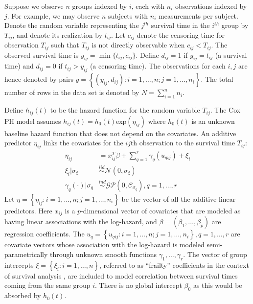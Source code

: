 \documentclass[ba]{imsart}
\begin{document}
Suppose we observe $n$ groups indexed by $i$, each with $n_{i}$ observations indexed by $j$. For example, we may observe $n$ subjects with $n_{i}$ measurements per subject. Denote the random variable representing the $j^{th}$ survival time in the $i^{th}$ group by $T_{ij}$, and denote its realization by $t_{ij}$. Let $c_{ij}$ denote the censoring time for observation $T_{ij}$ such that $T_{ij}$ is not directly observable when $c_{ij} < T_{ij}$. The observed survival time is $y_{ij} = \min\{t_{ij},c_{ij}\}$. Define $d_{ij} = 1$ if $y_{ij} = t_{ij}$ (a survival time) and $d_{ij} = 0$ if $t_{ij} > y_{ij}$ (a censoring time). The observations for each $i,j$ are hence denoted by pairs $y =  \left\{(y_{ij},d_{ij}): i = 1,\ldots,n; j = 1,\ldots,n_{i} \right\}$. The total number of rows in the data set is denoted by $N = \sum_{i=1}^{n}n_{i}$.

Define $h_{ij}(t)$ to be the hazard function for the random variable $T_{ij}$. The Cox PH model assumes $h_{ij}(t) = h_0(t)\text{exp}(\eta_{ij})$ where $h_0(t)$ is an unknown baseline hazard function that does not depend on the covariates. An additive predictor $\eta_{ij}$ links the covariates for the $ij$th observation to the survival time $T_{ij}$:
\begin{equation}\begin{aligned}\label{eqn:eta}
\eta_{ij} &=x_{ij}^{T}\beta+\sum_{q=1}^{r} \gamma_q(u_{qij}) +\xi_{i} \\
\xi_i | \sigma_{\xi} &\overset{iid}{\sim} \mathcal{N}(0,\sigma_{\xi}) \\
\gamma_{q}(\cdot)|\sigma_{q} &\overset{ind}{\sim} \mathcal{GP}\left(0,\mathcal{C}_{\sigma_q}\right), q = 1,\ldots,r
\end{aligned}\end{equation}
Let $\eta = \left\{ \eta_{ij}: i = 1,\ldots,n; j = 1,\ldots,n_{i}\right\}$ be the vector of all the additive linear predictors. Here $x_{ij}$ is a $p$-dimensional vector of covariates that are modeled as having linear associations with the log-hazard, and $\beta = (\beta_{1},\ldots,\beta_{p})$ are regression coefficients. The $u_{q} = \left\{u_{qij}: i = 1,\ldots,n; j = 1,\ldots,n_{i} \right\}, q = 1,\ldots,r$ are covariate vectors whose association with the log-hazard is modeled semi-parametrically through unknown smooth functions $\gamma_1,\ldots,\gamma_r$. The vector of group intercepts $\xi = \left\{ \xi_{i}: i=1,\ldots,n\right\}$, referred to as ``frailty'' coefficients in the context of survival analysis \citep{frailty}, are included to model correlation between survival times coming from the same group $i$. There is no global intercept $\beta_{0}$ as this would be absorbed by $h_{0}(t)$.
\end{document}
